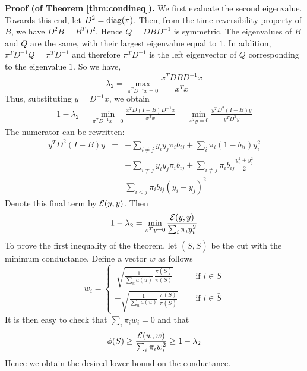 \documentclass{book}
\numberwithin{exercise}{chapter}
\begin{document}
\noindent
{\bf Proof (of Theorem \ref{thm:condineq}).}
We first evaluate the second eigenvalue. Towards this end, let $D^2={\rm diag}(\pi)$.
Then, from the time-reversibility property of $B$, we have $D^2B=B^TD^2$.
Hence $Q=DBD^{-1}$ is symmetric. The eigenvalues of $B$ and $Q$ are the same, with their
largest eigenvalue equal to $1$. In addition, $\pi^TD^{-1}Q=\pi^TD^{-1}$
and therefore $\pi^T D^{-1}$ is the left eigenvector of $Q$ corresponding to the eigenvalue
$1$. So we have,
$$\lambda_2=\max_{\pi^T D^{-1}x=0}\frac{x^TDBD^{-1}x}{x^Tx}$$
Thus, substituting $y=D^{-1}x$, we obtain
\begin{eqnarray*}
1-\lambda_2 =\min_{\pi^T D^{-1}x=0}\frac{x^TD(I-B)D^{-1}x}{x^Tx}
		=\min_{\pi^T y=0}\frac{y^TD^2(I-B)y}{y^TD^2y}
\end{eqnarray*}
The numerator can be rewritten:
\begin{eqnarray*}
y^TD^2(I-B)y
&=& -\sum_{i\neq j} y_iy_j\pi_ib_{ij}+\sum_{i}\pi_i(1-b_{ii})y_i^2\\
&=&-\sum_{i\neq j}  y_iy_j\pi_ib_{ij}+\sum_{i\neq j}\pi_ib_{ij}\frac{y_i^2+y_j^2}{2}\\
&=&\sum_{i<j}\pi_ib_{ij}(y_i-y_j)^2
\end{eqnarray*}
Denote this final term by $\cE(y,y)$. Then
\begin{eqnarray*}
1-\lambda_2=\min_{\pi^T y=0}\frac{{\mathcal E}(y,y)}{\sum_i \pi_i y_i^2}
\end{eqnarray*}
To prove the first inequality of the theorem, let $(S,\bar{S})$ be the
cut with the minimum conductance. Define a vector $w$ as follows
$$
w_i=
\begin{cases}
\ \sqrt{\frac{1}{\sum_u a(u)}\,\frac{\pi(\bar{S})}{\pi(S)}}
	&\quad \text{ if } i\in S \\[0.5cm]

-\sqrt{\frac{1}{\sum_u a(u)}\,\frac{\pi(S)}{\pi(\bar{S})}}
	&\quad \text{ if } i\in \bar{S}
\end{cases}
$$
It is then easy to check that $\sum_i \pi_i w_i=0$ and that
$$\phi(S) \ge \frac{\cE(w,w)}{\sum_i \pi_i w_i^2}\ge 1-\lambda_2 $$
Hence we obtain the desired lower bound on the conductance.
\end{document}
